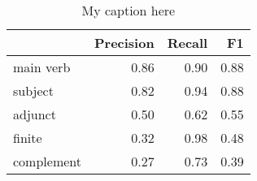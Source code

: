 \begin{table}[!ht]
\centering
\begin{tabular}{lrrr}
\toprule
{} &  Precision &  Recall &   F1 \\
\midrule
main verb  &       0.86 &    0.90 & 0.88 \\
subject    &       0.82 &    0.94 & 0.88 \\
adjunct    &       0.50 &    0.62 & 0.55 \\
finite     &       0.32 &    0.98 & 0.48 \\
complement &       0.27 &    0.73 & 0.39 \\
\bottomrule
\end{tabular}
\caption{My caption here}
\label{tab:unit-elements-mood-exact-F1}
\end{table}
